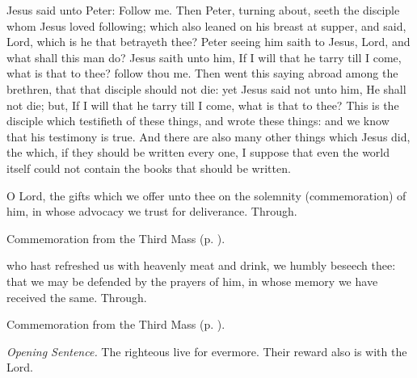  Jesus said unto Peter: Follow me. Then Peter, turning about, seeth the disciple whom Jesus loved following; which also leaned on his breast at supper, and said, Lord, which is he that betrayeth thee? Peter seeing him saith to Jesus, Lord, and what shall this man do? Jesus saith unto him, If I will that he tarry till I come, what is that to thee? follow thou me. Then went this saying abroad among the brethren, that that disciple should not die: yet Jesus said not unto him, He shall not die; but, If I will that he tarry till I come, what is that to thee? This is the disciple which testifieth of these things, and wrote these things: and we know that his testimony is true. And there are also many other things which Jesus did, the which, if they should be written every one, I suppose that even the world itself could not contain the books that should be written.

\secret
{} O Lord, the gifts which we offer unto thee on the solemnity (commemoration) of him, in whose advocacy we trust for deliverance. Through.
\begin{rubric}
    Commemoration  from the Third Mass (p. \pageref{NativityMassIIISecret}).
\end{rubric}
\postcommunion
{} who hast refreshed us with heavenly meat and drink, we humbly beseech thee: that we may be defended by the prayers of him, in whose memory we have received the same. Through.
\begin{rubric}
    Commemoration  from the Third Mass (p. \pageref{NativityMassIIIPostcommunion}).
\end{rubric}


\clearpage
{}
\par\noindent
\textit{Opening Sentence.} The righteous live for evermore. Their reward also is with the Lord.

